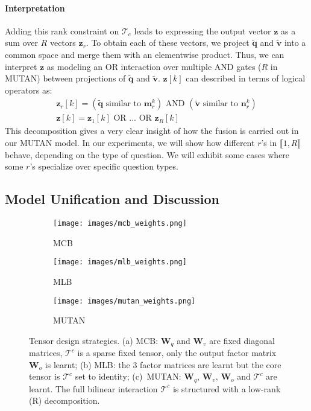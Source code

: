 \documentclass[10pt,twocolumn,letterpaper]{article}
\newcommand{\tens}[1]{
\bm{\mathcal{#1}}
}
\newcommand{\mat}[1]{\bm{#1}}
\newcommand{\z}{\mathbf{z}}
\newcommand{\tq}{\mathbf{\tilde{q}}}
\newcommand{\tv}{\mathbf{\tilde{v}}}
\begin{document}
\paragraph{Interpretation}
Adding this rank constraint on $\tens{T}_c$ leads to expressing the output vector $\z$ as a sum over $R$ vectors $\z_r$. To obtain each of these vectors, we project $\tq$ and $\tv$ into a common space and merge them with an elementwise product. Thus, we can interpret $\z$ as modeling an OR interaction over multiple AND gates ($R$ in MUTAN) between projections of $\tq$ and $\tv$. $\z[k]$ can described in terms of logical operators as: 
\begin{gather}
\z_r[k] = \left( \tq\text{ similar to }\mathbf{m}_r^k \right)\text{ AND }\left( \tv\text{ similar to }\mathbf{n}_r^k\right) \\
\z[k] = \z_1[k]\text{ OR }...\text{ OR }\z_R[k]
\end{gather}
This decomposition gives a very clear insight of how the fusion is carried out in our MUTAN model. In our experiments, we will show how different $r$'s in $\llbracket 1,  R\rrbracket$ behave, depending on the type of question. We will exhibit some cases where some $r$'s specialize over specific question types.
\subsection{Model Unification and Discussion}\label{uniformization}
\begin{figure*}[t]
\centering
  \begin{subfigure}{0.3\linewidth}
	\centering
    \texttt{[image: images/mcb\_weights.png]}
	\caption{\label{bilinear_compare:a} MCB}
  \end{subfigure}
  \hspace{1px}
  \begin{subfigure}{0.3\linewidth}
  \centering
    \texttt{[image: images/mlb\_weights.png]} 
    \caption{\label{bilinear_compare:b} MLB} 
  \end{subfigure} 
  \begin{subfigure}{0.3\linewidth}
  \centering
    \texttt{[image: images/mutan\_weights.png]}  
    \caption{\label{bilinear_compare:c} MUTAN}
  \end{subfigure}
  \caption{\label{bilinear_compare} Tensor design strategies. (a) MCB:  $\mat{W}_q$ and $\mat{W}_v$ are fixed diagonal matrices, $\tens{T}^c$ is a sparse fixed tensor, only the output factor matrix $\mat{W}_o$ is learnt; (b) MLB: the 3 factor matrices are learnt but the core tensor is $\tens{T}^c$  set to identity; 
 (c)~MUTAN: $\mat{W}_q$, $\mat{W}_v$, $\mat{W}_o$ and $\tens{T}^c$ are learnt. The  full bilinear interaction $\tens{T}^c$ is structured with a low-rank (R) decomposition.
}
  \label{fig7} 
\end{figure*}
\end{document}
